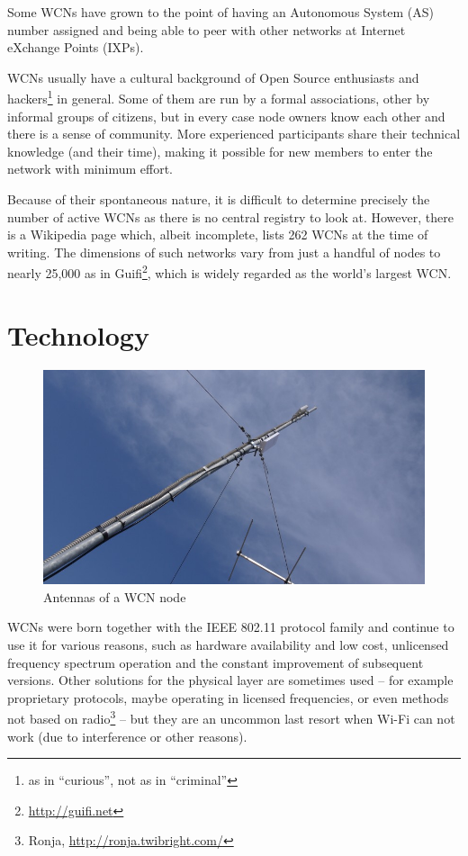 \documentclass[a4paper,11pt,twoside,openright]{memoir}
\begin{document}
Some WCNs have grown to
the point of having an Autonomous System (AS) number assigned and being able to
peer with other networks at Internet eXchange Points (IXPs).

WCNs usually have a cultural background of Open Source enthusiasts and
hackers\footnote{as in ``curious'', not as in ``criminal''} in general.
Some of them are run by a formal associations, other by informal groups
of citizens, but in every case node owners know each other and there is
a sense of community. More experienced participants share their
technical knowledge (and their time), making it possible for new members
to enter the network with minimum effort.

Because of their spontaneous nature, it is difficult to
determine precisely the number of active WCNs as there is no central
registry to look at. However, there is a Wikipedia page\cite{_list_2014}
which, albeit incomplete, lists 262 WCNs at the
time of writing. The dimensions of such networks vary from just a
handful of nodes to nearly 25,000 as in Guifi\footnote{\url{http://guifi.net}},
which is widely regarded as the world's largest WCN.

\section{Technology}\label{technology}

\begin{figure}[htbp]
\centering
\includegraphics{images/ninux_node.png}
\caption{Antennas of a WCN node}
\label{fig:antennas}
\end{figure}

WCNs were born together with the IEEE 802.11 protocol family and
continue to use it for various reasons, such as hardware availability
and low cost, unlicensed frequency spectrum operation and the constant
improvement of subsequent versions. Other solutions for the physical
layer are sometimes used -- for example proprietary protocols, maybe
operating in licensed frequencies, or even methods not based on
radio\footnote{Ronja, \url{http://ronja.twibright.com/}} -- but they are
an uncommon last resort when Wi-Fi can not work (due to interference or
other reasons).
\end{document}
